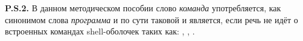 \noindent  \textbf{P.S.2.} В данном методическом пособии слово \textit{команда} употребляется, как синонимом слова \textit{программа} и по сути таковой и является, если речь не идёт о встроенных командах shell-оболочек таких как: , , .






